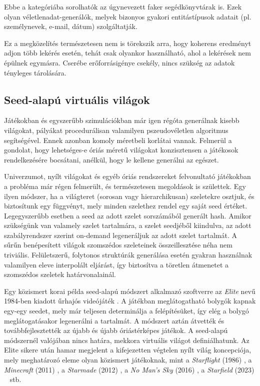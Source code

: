 \documentclass[
    parspace,
    noindent,
    nohyp,
]{elteiktdk}[2023/04/10]
\newcommand{\todoref}[1]{\todo[inline, noinlinepar, color=red, textcolor=white, inlinewidth=0.6cm, caption={#1}]{\large \textbf{×}}}
\begin{document}
Ebbe a kategóriába sorolhatók az úgynevezett faker segédkönyvtárak is.
Ezek olyan véletlenadat-generálók,
melyek bizonyos gyakori entitástípusok adatait (pl. személynevek, e-mail, dátum) szolgáltatják.
\todoref{+CITE: faker segédkönyvtárak}

Ez a megközelítés természetesen nem is törekszik arra,
hogy koherens eredményt adjon több lekérés esetén,
tehát csak olyankor használható, ahol a lekérések nem épülnek egymásra.
Cserébe erőforrásigénye csekély, nincs szükség az adatok tényleges tárolására.
\todoref{kérések mockolása: az on-demand schema ennek a koherenssé tett változata is}

\subsection{Seed-alapú virtuális világok}

Játékokban és egyszerűbb szimulációkban már igen régóta generálnak kisebb világokat,
pályákat procedurálisan valamilyen pszeudovéletlen algoritmus segítségével.
Ennek azonban komoly méretbeli korlátai vannak.
Felmerül a gondolat, hogy lehetséges-e óriás méretű világokat konzisztensen
a játékosok rendelkezésére bocsátani, anélkül, hogy le kellene generálni az egészet.

Univerzumot, nyílt világokat és egyéb óriás rendszereket felvonultató játékokban
a probléma már régen felmerült, és természetesen megoldások is születtek.
Egy ilyen módszer, ha a világteret (sorosan vagy hierarchikusan)
szeletekre osztjuk, és biztosítunk egy függvényt,
mely minden szelethez rendel egy saját seed értéket.
Legegyszerűbb esetben a seed az adott szelet sorszámából generált hash.
Amikor szükségünk van valamely szelet tartalmára, a szelet seedjéből kiindulva,
az adott szabályrendszer szerint on-demand legeneráljuk az adott szelet tartalmát.
A sűrűn benépesített világok szomszédos szeleteinek összeillesztése néha nem triviális.
Felületszerű, folytonos struktúrák generálása esetén gyakran használnak
valamilyen eleve interpolált eljárást,
így biztosítva a töretlen átmenetet a szomszédos szeletek határvonalainál.

Egy közismert korai példa seed-alapú módszert alkalmazó szoftverre
az \textit{Elite} nevű 1984-ben kiadott űrhajós videójáték \todoref{Játék: Elite (1984)}.
A játékban meglátogatható bolygók kapnak egy-egy seedet, mely már teljesen determinálja a felépítésüket,
így elég a bolygó meglátogatásakor legenerálni a tartalmát.
A módszert aztán átvették és továbbfejlesztették az újabb és újabb óriástérképes játékok.
A seed-alapú módszernél valójában nincs határa, mekkora virtuális világot definiálhatunk.
Az Elite sikere után hamar megjelent a kifejezetten végtelen nyílt világ koncepciója,
mely meghatározó eleme olyan közismert játékoknak,
mint a \textit{Starflight} (1986) \todoref{+CITE: Játék: Starflight (1986)},
a \textit{Minecraft} (2011) \todoref{+CITE: Játék: Minecraft (2011)},
a \textit{Starmade} (2012) \todoref{+CITE: Játék: Starmade (2012)},
a \textit{No Man's Sky} (2016) \todoref{+CITE: Játék: No Man's Sky (2016)},
a \textit{Starfield} (2023) \todoref{+CITE: Játék: Starfield (2023)}~
stb.
\end{document}
